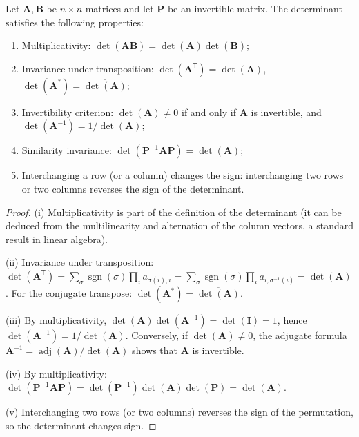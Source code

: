 \begin{property}\label{ch5_determinant_properties}
Let $\mathbf{A}, \mathbf{B}$ be $n \times n$ matrices and let $\mathbf{P}$ be an invertible matrix. The determinant satisfies the following properties:
\begin{enumerate}[label=(\roman*)]
    \item Multiplicativity: $\det(\mathbf{A}\mathbf{B}) = \det(\mathbf{A})\det(\mathbf{B})$;
    \item Invariance under transposition: $\det(\mathbf{A}^{\mathsf T}) = \det(\mathbf{A})$, $\det(\mathbf{A}^*) = \overline{\det(\mathbf{A})}$;
    \item Invertibility criterion: $\det(\mathbf{A}) \neq 0$ if and only if $\mathbf{A}$ is invertible, and $\det(\mathbf{A}^{-1}) = 1/\det(\mathbf{A})$;
    \item Similarity invariance: $\det(\mathbf{P}^{-1}\mathbf{A}\mathbf{P}) = \det(\mathbf{A})$;
    \item Interchanging a row (or a column) changes the sign: interchanging two rows or two columns reverses the sign of the determinant.
\end{enumerate}
\end{property}

\begin{proof}
(i) Multiplicativity is part of the definition of the determinant (it can be deduced from the multilinearity and alternation of the column vectors, a standard result in linear algebra).

(ii) Invariance under transposition: $\det(\mathbf{A}^{\mathsf T}) = \sum_{\sigma} \operatorname{sgn}(\sigma) \prod_i a_{\sigma(i),i} = \sum_{\sigma} \operatorname{sgn}(\sigma) \prod_i a_{i,\sigma^{-1}(i)} = \det(\mathbf{A})$. For the conjugate transpose: $\det(\mathbf{A}^*) = \overline{\det(\mathbf{A})}$.

(iii) By multiplicativity, $\det(\mathbf{A})\det(\mathbf{A}^{-1}) = \det(\mathbf{I}) = 1$, hence $\det(\mathbf{A}^{-1}) = 1/\det(\mathbf{A})$. Conversely, if $\det(\mathbf{A}) \neq 0$, the adjugate formula $\mathbf{A}^{-1} = \operatorname{adj}(\mathbf{A})/\det(\mathbf{A})$ shows that $\mathbf{A}$ is invertible.

(iv) By multiplicativity: $\det(\mathbf{P}^{-1}\mathbf{A}\mathbf{P}) = \det(\mathbf{P}^{-1})\det(\mathbf{A})\det(\mathbf{P}) = \det(\mathbf{A})$.

(v) Interchanging two rows (or two columns) reverses the sign of the permutation, so the determinant changes sign.
\end{proof}


